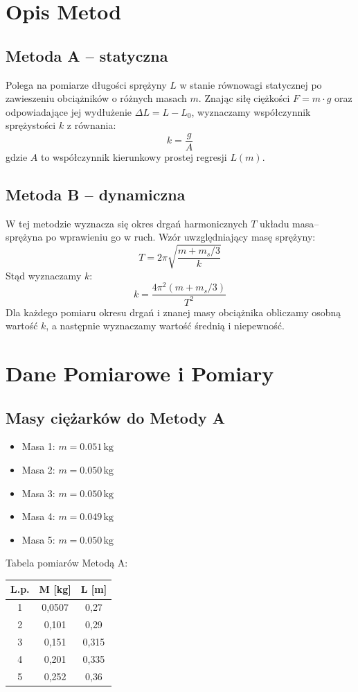 \documentclass[12pt]{article}
\begin{document}
\section*{Opis Metod}
\subsection*{Metoda A – statyczna}
Polega na pomiarze długości sprężyny \( L \) w stanie równowagi statycznej po zawieszeniu obciążników o różnych masach \( m \). Znając siłę ciężkości \( F = m \cdot g \) oraz odpowiadające jej wydłużenie \( \Delta L = L - L_0 \), wyznaczamy współczynnik sprężystości \( k \) z równania:
\[
k = \frac{g}{A}
\]
gdzie \( A \) to współczynnik kierunkowy prostej regresji \( L(m) \).
\subsection*{Metoda B – dynamiczna}
W tej metodzie wyznacza się okres drgań harmonicznych \( T \) układu masa–sprężyna po wprawieniu go w ruch. Wzór uwzględniający masę sprężyny:
\[
T = 2\pi \sqrt{\frac{m + m_s/3}{k}}
\]
Stąd wyznaczamy \( k \):
\[
k = \frac{4\pi^2 (m + m_s/3)}{T^2}
\]
Dla każdego pomiaru okresu drgań i znanej masy obciążnika obliczamy osobną wartość \( k \), a następnie wyznaczamy wartość średnią i niepewność.

\section*{Dane Pomiarowe i Pomiary}
\subsection*{Masy ciężarków do Metody A}
\begin{itemize}
    \item Masa 1: \( m = 0.051 \, \text{kg} \)
    \item Masa 2: \( m = 0.050 \, \text{kg} \)
    \item Masa 3: \( m = 0.050 \, \text{kg} \)
    \item Masa 4: \( m = 0.049 \, \text{kg} \)
    \item Masa 5: \( m = 0.050 \, \text{kg} \)
\end{itemize}
Tabela pomiarów Metodą A:
\begin{center}
    \begin{tabular}{|c|c|c|}
    \hline
    L.p. & M [kg] & L [m]  \\
    \hline
    1 & 0{,}0507 & 0{,}27  \\
    2 & 0{,}101 & 0{,}29  \\
    3 & 0{,}151 & 0{,}315  \\
    4 & 0{,}201 & 0{,}335  \\
    5 & 0{,}252 & 0{,}36  \\
    \hline
    \end{tabular}
\end{center}
\end{document}
